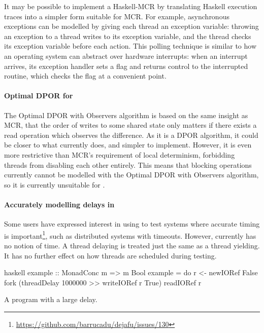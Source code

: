 It may be possible to implement a Haskell-MCR by translating Haskell
execution traces into a simpler form suitable for MCR\@.  For example,
asynchronous exceptions can be modelled by giving each thread an
exception variable: throwing an exception to a thread writes to its
exception variable, and the thread checks its exception variable
before each action.  This polling technique is similar to how an
operating system can abstract over hardware interrupts: when an
interrupt arrives, its exception handler sets a flag and returns
control to the interrupted routine, which checks the flag at a
convenient point.

\paragraph{Optimal DPOR for \dejafu{}}
The Optimal DPOR with Observers algorithm \parencite{aronis2018} is
based on the same insight as MCR, that the order of writes to some
shared state only matters if there exists a read operation which
observes the difference.  As it is a DPOR algorithm, it could be
closer to what \dejafu{} currently does, and simpler to implement.
However, it is even more restrictive than MCR's requirement of local
determinism, forbidding threads from disabling each other entirely.
This means that blocking operations currently cannot be modelled with
the Optimal DPOR with Observers algorithm, so it is currently
unsuitable for \dejafu{}.

\paragraph{Accurately modelling delays in \dejafu{}}
Some users have expressed interest in using \dejafu{} to test systems
where accurate timing is
important\footnote{\url{https://github.com/barrucadu/dejafu/issues/130}},
such as distributed systems with timeouts.  However, \dejafu{}
currently has no notion of time.  A thread delaying is treated just
the same as a thread yielding.  It has no further effect on how
threads are scheduled during testing.

\begin{listing}
\centering
\begin{cminted}{haskell}
example :: MonadConc m => m Bool
example = do
    r <- newIORef False
    fork (threadDelay 1000000 >> writeIORef r True)
    readIORef r
\end{cminted}
\caption{A program with a large delay.}\label{lst:unreasonable}
\end{listing}

